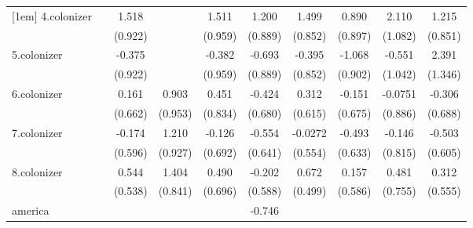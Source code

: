 {\begin{tabular}{l*{9}{c}}
[1em]
4.colonizer &                     &       1.518         &                     &       1.511         &       1.200         &       1.499\sym{*}  &       0.890         &       2.110\sym{*}  &       1.215         \\
            &                     &     (0.922)         &                     &     (0.959)         &     (0.889)         &     (0.852)         &     (0.897)         &     (1.082)         &     (0.851)         \\
[1em]
5.colonizer &                     &      -0.375         &                     &      -0.382         &      -0.693         &      -0.395         &      -1.068         &      -0.551         &       2.391\sym{*}  \\
            &                     &     (0.922)         &                     &     (0.959)         &     (0.889)         &     (0.852)         &     (0.902)         &     (1.042)         &     (1.346)         \\
[1em]
6.colonizer &                     &       0.161         &       0.903         &       0.451         &      -0.424         &       0.312         &      -0.151         &     -0.0751         &      -0.306         \\
            &                     &     (0.662)         &     (0.953)         &     (0.834)         &     (0.680)         &     (0.615)         &     (0.675)         &     (0.886)         &     (0.688)         \\
[1em]
7.colonizer &                     &      -0.174         &       1.210         &      -0.126         &      -0.554         &     -0.0272         &      -0.493         &      -0.146         &      -0.503         \\
            &                     &     (0.596)         &     (0.927)         &     (0.692)         &     (0.641)         &     (0.554)         &     (0.633)         &     (0.815)         &     (0.605)         \\
[1em]
8.colonizer &                     &       0.544         &       1.404         &       0.490         &      -0.202         &       0.672         &       0.157         &       0.481         &       0.312         \\
            &                     &     (0.538)         &     (0.841)         &     (0.696)         &     (0.588)         &     (0.499)         &     (0.586)         &     (0.755)         &     (0.555)         \\
[1em]
america     &                     &                     &                     &                     &      -0.746         &                     &                     &                     &                     \\

\end{tabular}}
